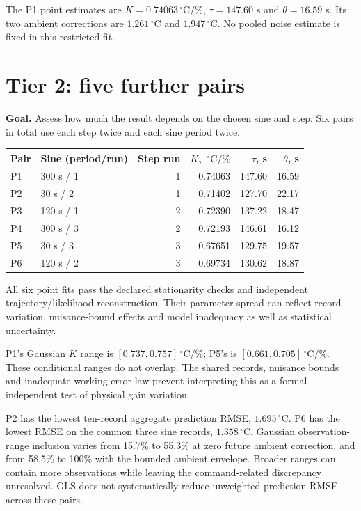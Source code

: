 \documentclass[10pt,letterpaper]{article}
\newcommand{\C}{\,^\circ\mathrm{C}}
\begin{document}
The P1 point estimates are $K=0.74063\C/\%$, $\tau=147.60$ s and $\theta=16.59$ s. Its two ambient corrections are $1.261\C$ and $1.947\C$. No pooled noise estimate is fixed in this restricted fit.


\FloatBarrier
\section{Tier 2: five further pairs}
\textbf{Goal.} Assess how much the result depends on the chosen sine and step. Six pairs in total use each step twice and each sine period twice.

\begin{tabular}{@{}llrrrr@{}}
\toprule
Pair & Sine (period/run) & Step run & $K$, $\C/\%$ & $\tau$, s & $\theta$, s\\
\midrule
P1 & 300 s / 1 & 1 & 0.74063 & 147.60 & 16.59\\
P2 & 30 s / 2 & 1 & 0.71402 & 127.70 & 22.17\\
P3 & 120 s / 1 & 2 & 0.72390 & 137.22 & 18.47\\
P4 & 300 s / 3 & 2 & 0.72193 & 146.61 & 16.12\\
P5 & 30 s / 3 & 3 & 0.67651 & 129.75 & 19.57\\
P6 & 120 s / 2 & 3 & 0.69734 & 130.62 & 18.87\\
\bottomrule
\end{tabular}

All six point fits pass the declared stationarity checks and independent trajectory/likelihood reconstruction. Their parameter spread can reflect record variation, nuisance-bound effects and model inadequacy as well as statistical uncertainty.


P1's Gaussian $K$ range is $[0.737,0.757]\C/\%$; P5's is $[0.661,0.705]\C/\%$. These conditional ranges do not overlap. The shared records, nuisance bounds and inadequate working error law prevent interpreting this as a formal independent test of physical gain variation.

P2 has the lowest ten-record aggregate prediction RMSE, $1.695\C$. P6 has the lowest RMSE on the common three sine records, $1.358\C$. Gaussian observation-range inclusion varies from 15.7\% to 55.3\% at zero future ambient correction, and from 58.5\% to 100\% with the bounded ambient envelope. Broader ranges can contain more observations while leaving the command-related discrepancy unresolved. GLS does not systematically reduce unweighted prediction RMSE across these pairs.
\end{document}
